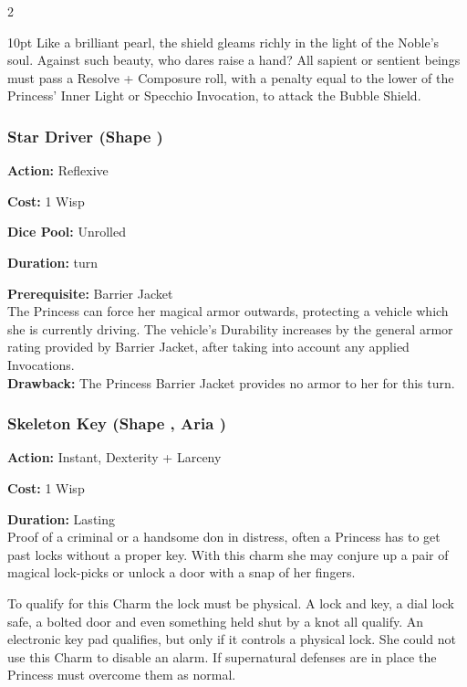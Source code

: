\begin{multicols}{2}
\begin{myindentpar}{10pt}
Like a brilliant pearl, the shield gleams richly in the light of the Noble's soul. Against such beauty, who dares raise a hand? All sapient or sentient beings must pass a Resolve + Composure roll, with a penalty equal to the lower of the Princess' Inner Light or Specchio Invocation, to attack the Bubble Shield.\end{myindentpar}

\subsubsection*{Star Driver (Shape \textbullet)}

\noindent \textbf{Action:} Reflexive

\noindent \textbf{Cost:} 1 Wisp

\noindent \textbf{Dice Pool:} Unrolled

\noindent \textbf{Duration:} turn 

\noindent \textbf{Prerequisite:} Barrier Jacket \\

\noindent The Princess can force her magical armor outwards, protecting a vehicle which she is currently driving. The vehicle's Durability increases by the general armor rating provided by Barrier Jacket, after taking into account any applied Invocations. \\

\textbf{Drawback:} The Princess Barrier Jacket provides no armor to her for this turn. 

\subsubsection*{Skeleton Key (Shape \textbullet, Aria \textbullet)}

\noindent \textbf{Action:} Instant, Dexterity + Larceny

\noindent \textbf{Cost:} 1 Wisp

\noindent \textbf{Duration:} Lasting \\

\noindent Proof of a criminal or a handsome don in distress, often a Princess has to get past locks without a proper key. With this charm she may conjure up a pair of magical lock-picks or unlock a door with a snap of her fingers. 

To qualify for this Charm the lock must be physical. A lock and key, a dial lock safe, a bolted door and even something held shut by a knot all qualify. An electronic key pad qualifies, but only if it controls a physical lock. She could not use this Charm to disable an alarm. If supernatural defenses are in place the Princess must overcome them as normal. 


\end{multicols}
